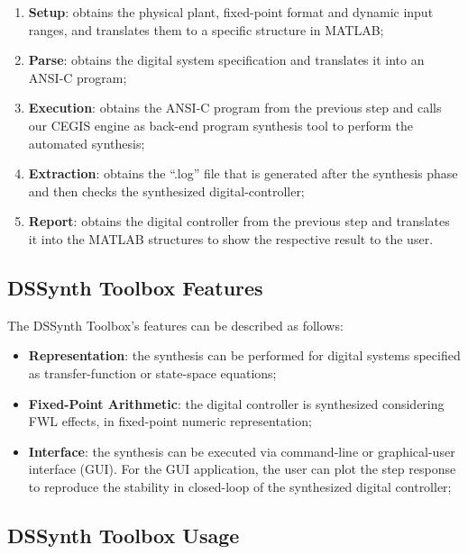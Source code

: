 \documentclass[sigconf]{acmart}
\newcommand\tool{{DSSynth Toolbox}\xspace}
\begin{document}
\begin{enumerate}
\item \textbf{Setup}: obtains the physical plant, fixed-point format 
and dynamic input ranges, and translates them to a specific structure in MATLAB;
\item \textbf{Parse}: obtains the digital system specification and translates 
it into an ANSI-C program;
\item \textbf{Execution}: obtains the ANSI-C program from the previous step 
and calls our CEGIS engine as back-end program synthesis tool to perform the automated synthesis;
\item \textbf{Extraction}: obtains the ``.log'' file that is generated 
after the synthesis phase and then checks the synthesized digital-controller;
\item \textbf{Report}: obtains the digital controller from the previous step 
and translates it into the MATLAB structures to show the respective result to the user.
\end{enumerate}

\subsection{\tool Features}

The \tool's features can be described as follows:

\begin{itemize}
\item \textbf{Representation}: the synthesis can be 
performed for digital systems specified as 
transfer-function or state-space equations;
\item \textbf{Fixed-Point Arithmetic}: the digital 
controller is synthesized considering FWL effects, 
in fixed-point numeric representation;
\item \textbf{Interface}: the synthesis can be executed 
via command-line or graphical-user interface (GUI). 
For the GUI application, the user can plot the step response 
to reproduce the stability in closed-loop of the synthesized digital controller;
\end{itemize}

\subsection{\tool Usage}
\end{document}
